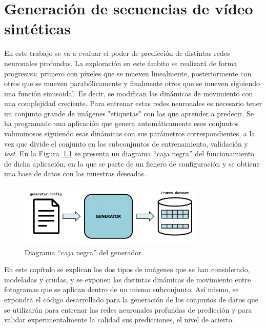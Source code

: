 \chapter{Generación de secuencias de vídeo sintéticas}\label{cap.generacion}

En este trabajo se va a evaluar el poder de predicción de distintas redes neuronales profundas. La exploración en este ámbito se realizará de forma progresiva: primero con píxeles que se mueven linealmente, posteriormente con otros que se mueven parabólicamente y finalmente otros que se mueven siguiendo una función sinusoidal. Es decir, se modifican las dinámicas de movimiento con una complejidad creciente. Para entrenar estas redes neuronales es necesario tener un conjunto grande de imágenes "etiquetas" con las que aprender a predecir. Se ha programado una aplicación que genera automáticamente esos conjuntos voluminosos siguiendo esas dinámicas con sus parámetros correspondientes, a la vez que divide el conjunto en los subconjuntos de entrenamiento, validación y \textit{test}. En la Figura~\ref{fig.gen_cajanegra} se presenta un diagrama ``caja negra'' del funcionamiento de dicha aplicación, en la que se parte de un fichero de configuración y se obtiene una base de datos con las muestras deseadas.

\begin{figure}[H]
		\begin{center}
			\includegraphics[width=0.8\textwidth]{ figures/generador.png}
			\caption{Diagrama ``caja negra'' del generador.}
			\label{fig.gen_cajanegra}
		\end{center}
\end{figure}

En este capítulo se explican los dos tipos de imágenes que se han considerado, modeladas y crudas, y se exponen las distintas dinámicas de movimiento entre fotogramas que se aplican dentro de un mismo subconjunto. Así mismo, se expondrá el código desarrollado para la generación de los conjuntos de datos que se utilizarán para entrenar las redes neuronales profundas de predicción y para validar experimentalmente la calidad sus predicciones, el nivel de acierto.


